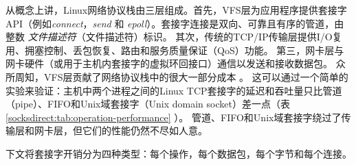 从概念上讲，Linux网络协议栈由三层组成。首先，VFS层为应用程序提供套接字API（例如\emph {connect}，\emph {send} 和 \emph {epoll}）。套接字连接是双向、可靠且有序的管道，由整数 \emph {文件描述符}（文件描述符）标识。
其次，传统的TCP/IP传输层提供I/O复用、拥塞控制、丢包恢复、路由和服务质量保证（QoS）功能。
第三，网卡层与网卡硬件（或用于主机内套接字的虚拟环回接口）通信以发送和接收数据包。
众所周知，VFS层贡献了网络协议栈中的很大一部分成本 \cite {clark1989analysis,boyd2010analysis}。
这可以通过一个简单的实验来验证：主机中两个进程之间的Linux TCP套接字的延迟和吞吐量只比管道（pipe）、FIFO和Unix域套接字（Unix domain socket）差一点（表 \ref {socksdirect:tab:operation-performance} ）。
管道、FIFO和Unix域套接字绕过了传输层和网卡层，但它们的性能仍然不尽如人意。

下文将套接字开销分为四种类型：每个操作，每个数据包，每个字节和每个连接。


